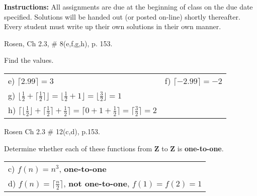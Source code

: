 \documentclass[11pt]{exam}
\begin{document}
\extrawidth{0.5in}%
\pagestyle{headandfoot}%
 \headrule
  \footrule {}

\addpoints

\noindent \textbf{Instructions:} All assignments are due at the
beginning of class on the due date specified.  Solutions will be
handed out (or posted on-line) shortly thereafter.  Every student
must write up their own solutions in their own manner.

\begin{questions}
\printanswers

\question Rosen, Ch 2.3, \# 8(e,f,g,h), p. 153.
\begin{solution}
Find the values.

\begin{tabular}{ll}
    e) $\lceil 2.99 \rceil = 3$ &     f) $\lceil-2.99 \rceil = -2$\\
    \multicolumn{1}{l}{g) $\lfloor \frac{1}{2} + \lceil \frac{1}{2} \rceil \rfloor = \lfloor \frac{1}{2} + 1 \rfloor = \lfloor \frac{3}{2} \rfloor = 1$ } \\
    \multicolumn{1}{l}{h) $\lceil \lfloor \frac{1}{2} \rfloor + \lceil \frac{1}{2} \rceil + \frac{1}{2} \rceil = \lceil 0 + 1 + \frac{1}{2} \rceil = \lceil \frac{3}{2} \rceil = 2$} \\
\end{tabular}
\end{solution}


\question Rosen Ch 2.3 \# 12(c,d), p.153. %
\begin{solution}
Determine whether each of these functions from $\mathbf{Z}$ to $\mathbf{Z}$ is \textbf{one-to-one}.

\begin{tabular}{l}
 c) $f(n) = n^3$, \textbf{one-to-one} \\
 d) $f(n) = \lceil \frac{n}{2} \rceil$, \textbf{not one-to-one}, $f(1) = f(2) = 1$ \\
\end{tabular}
\end{solution}



\end{questions}
\end{document}
